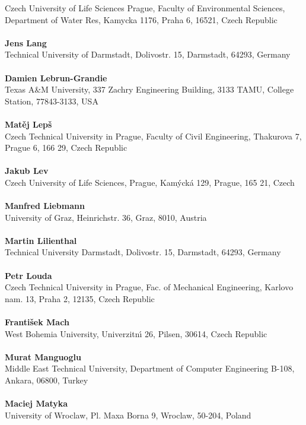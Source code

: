 Czech University of Life Sciences Prague, Faculty of Environmental Sciences, Department of Water Res, Kamycka 1176, Praha 6, 16521, Czech Republic\\ 
\\ 
\textbf{Jens Lang}
\\ 
Technical University of Darmstadt, Dolivostr. 15, Darmstadt, 64293, Germany\\ 
\\ 
\textbf{Damien Lebrun-Grandie}
\\ 
Texas A\&M University, 337 Zachry Engineering Building, 3133 TAMU, College Station, 77843-3133, USA\\ 
\\ 
\textbf{Mat\v{e}j Lepš}
\\ 
Czech Technical University in Prague, Faculty of Civil Engineering, Thakurova 7, Prague 6, 166 29, Czech Republic\\ 
\\ 
\textbf{Jakub Lev}
\\ 
Czech University of Life Sciences, Prague, Kam\'yck\'a 129, Prague, 165 21, Czech\\ 
\\ 
\textbf{Manfred Liebmann}
\\ 
University of Graz, Heinrichstr. 36, Graz, 8010, Austria\\ 
\\ 
\textbf{Martin Lilienthal}
\\ 
Technical University Darmstadt, Dolivostr. 15, Darmstadt, 64293, Germany\\ 
\\ 
\textbf{Petr Louda}
\\ 
Czech Technical University in Prague, Fac. of Mechanical Engineering, Karlovo nam. 13, Praha 2, 12135, Czech Republic\\ 
\\ 
\textbf{František Mach}
\\ 
West Bohemia University, Univerzitn\'{\i} 26, Pilsen, 30614, Czech Republic\\ 
\\ 
\textbf{Murat Manguoglu}
\\ 
Middle East Technical University, Department of Computer Engineering B-108, Ankara, 06800, Turkey\\ 
\\ 
\textbf{Maciej Matyka}
\\ 
University of Wroclaw, Pl. Maxa Borna 9, Wroclaw, 50-204, Poland\\ 
\\ 
